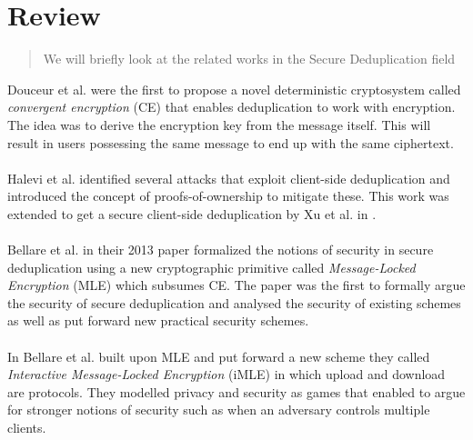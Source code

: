 \chapter{Review}
\label{chap:review}

\begin{quote} \small
	We will briefly look at the related works in the Secure Deduplication field
\end{quote}

\noindent
Douceur et al. \cite{convergentEnc} were the first to propose a novel deterministic cryptosystem
called \textit{convergent encryption} (CE) that enables deduplication to work with
encryption. The idea was to derive the encryption key from the message itself. This
will result in users possessing the same message to end up with the same ciphertext.
\\ \\
Halevi et al. \cite{proofOwner} identified several attacks that exploit client-side
deduplication and introduced the concept of proofs-of-ownership to mitigate these. This
work was extended to get a secure client-side deduplication by Xu et al. in \cite{weakLeakage}.
\\ \\
Bellare et al. in their 2013 paper \cite{mle} formalized the notions of security
in secure deduplication using a new cryptographic primitive called 
\textit{Message-Locked Encryption} (MLE) which subsumes CE. 
The paper was the first to formally argue
the security of secure deduplication and analysed the security of existing schemes as
well as put forward new practical security schemes.
\\ \\
In \cite{imle} Bellare et al. built upon MLE and put forward a new scheme they called
\textit{Interactive Message-Locked Encryption} (iMLE) in which upload and download are
protocols. They modelled privacy and security as games that enabled to argue for stronger notions
of security such as when an adversary controls multiple clients.